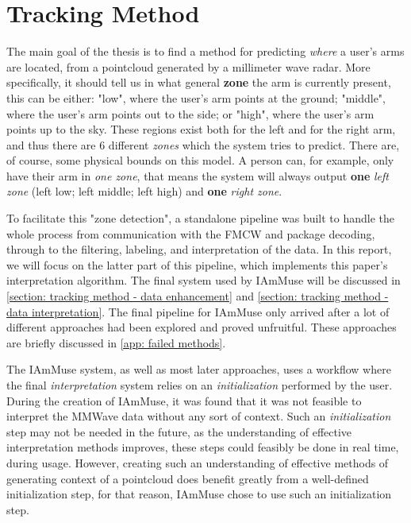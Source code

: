 \chapter{Tracking Method}
\label{chapter: tracking method}

The main goal of the thesis is to find a method for predicting \textit{where} a user's arms are located, from a pointcloud generated by a millimeter wave radar.
More specifically, it should tell us in what general \textbf{zone} the arm is currently present, this can be either: 
"low", where the user's arm points at the ground;
"middle", where the user's arm points out to the side;
or "high", where the user's arm points up to the sky.
These regions exist both for the left and for the right arm, and thus there are 6 different \textit{zones} which the system tries to predict.
There are, of course, some physical bounds on this model. 
A person can, for example, only have their arm in \textit{one zone}, that means the system will always output \textbf{one} \textit{left zone} (left low; left middle; left high) and \textbf{one} \textit{right zone}.

To facilitate this "zone detection", a standalone pipeline was built to handle the whole process from communication with the FMCW and package decoding, through to the filtering, labeling, and interpretation of the data. 
In this report, we will focus on the latter part of this pipeline, which implements this paper's interpretation algorithm.
The final system used by IAmMuse will be discussed in \cref{section: tracking method - data enhancement}
 and \cref{section: tracking method - data interpretation}.
The final pipeline for IAmMuse only arrived after a lot of different approaches had been explored and proved unfruitful.
These approaches are briefly discussed in \cref{app: failed methods}.


The IAmMuse system, as well as most later approaches, uses a workflow where the final \textit{interpretation} system relies on an \textit{initialization} performed by the user.
During the creation of IAmMuse, it was found that it was not feasible to interpret the MMWave data without any sort of context.
Such an \textit{initialization} step may not be needed in the future, as the understanding of effective interpretation methods improves, these steps could feasibly be done in real time, during usage.
However, creating such an understanding of effective methods of generating context of a pointcloud does benefit greatly from a well-defined initialization step, for that reason, IAmMuse chose to use such an initialization step.





